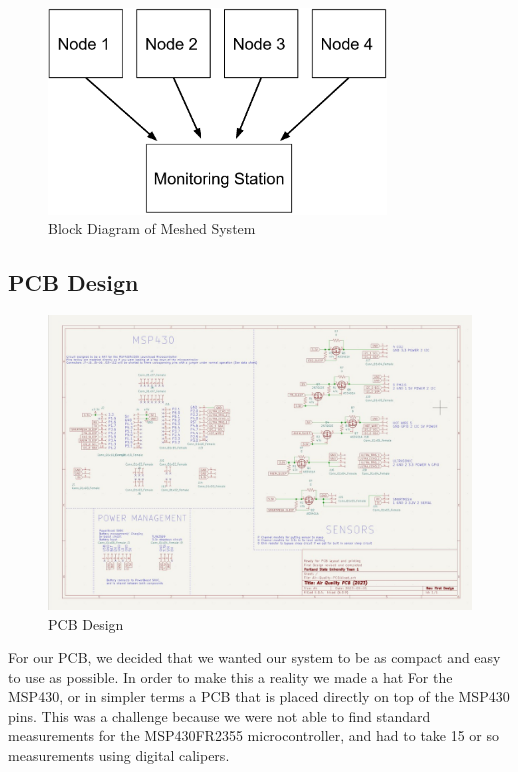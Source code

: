 \begin{figure}[H]
    \centering
    \includegraphics[width=0.8\textwidth]{Pictures/image (6).png}
    \caption[Block Diagram of Meshed System]{Block Diagram of Meshed System} 
    \label{fig:part1commrin}
\end{figure}

\subsection{PCB Design}
\begin{figure}[H]
    \centering
    \includegraphics[width=1.0\textwidth]{Pictures/image (8).png}
    \caption[PCB Design]{PCB Design} 
    \label{fig:part1commrin}
\end{figure}

For our PCB, we decided that we wanted our system to be as compact and easy to use as possible. In order to make this a reality we made a hat For the MSP430, or in simpler terms a PCB that is placed directly on top of the MSP430 pins. This was a challenge because we were not able to find standard measurements for the MSP430FR2355 microcontroller, and had to take 15 or so measurements using digital calipers. 

